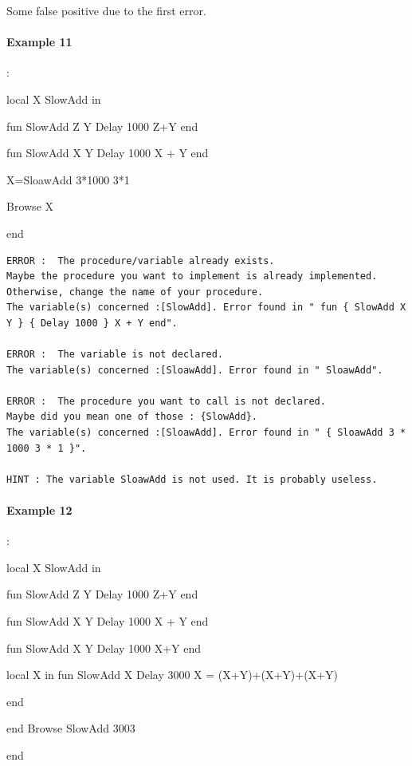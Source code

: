 \documentclass[11pt,a4paper,twoside,openright]{report}
\begin{document}
Some false positive due to the first error.

\newpage
\paragraph{Example 11}:

\begin{OZ}
local X SlowAdd in 
	
	fun {SlowAdd Z Y}
	   	{Delay 1000}
   		Z+Y   		
	end

	
    fun {SlowAdd X Y}
		   {Delay 1000}
			   X + Y
	end
    
    X={SloawAdd 3*1000 3*1}

    {Browse X}

end
\end{OZ}

\begin{lstlisting}
ERROR :  The procedure/variable already exists. 
Maybe the procedure you want to implement is already implemented. 
Otherwise, change the name of your procedure. 
The variable(s) concerned :[SlowAdd]. Error found in " fun { SlowAdd X Y } { Delay 1000 } X + Y end".

ERROR :  The variable is not declared. 
The variable(s) concerned :[SloawAdd]. Error found in " SloawAdd".

ERROR :  The procedure you want to call is not declared. 
Maybe did you mean one of those : {SlowAdd}. 
The variable(s) concerned :[SloawAdd]. Error found in " { SloawAdd 3 * 1000 3 * 1 }".

HINT : The variable SloawAdd is not used. It is probably useless.
\end{lstlisting}
\newpage
\paragraph{Example 12}:

\begin{OZ}
local X SlowAdd in 
	
	fun {SlowAdd Z Y}
	   	{Delay 1000}
   		Z+Y   		
	end

	
    fun {SlowAdd X Y}
		   {Delay 1000}
			   X + Y
	end
    
   	fun {SlowAdd X Y}
    		{Delay 1000}
	    X+Y
	end

	local X in
    		fun {SlowAdd X }
        		{Delay 3000}
            	X = (X+Y)+(X+Y)+(X+Y)
        
    		end
    
    end  
    {Browse {SlowAdd 3003}}

end
\end{OZ}
\end{document}
